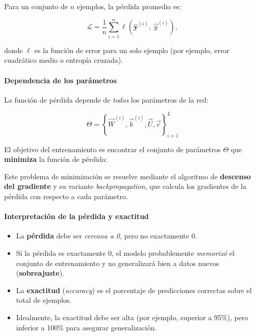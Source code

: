 Para un conjunto de $n$ ejemplos, la pérdida promedio es:

\begin{equation}
\label{eq:loss}
\mathcal{L} = \frac{1}{n} \sum_{i=1}^{n} \ell\!\left( \hat{\mathbf{y}}^{(i)},\, \vec{y}^{(i)} \right),
\end{equation}

donde $\ell$ es la función de error para un solo ejemplo (por ejemplo, error cuadrático medio o entropía cruzada).

\paragraph{Dependencia de los parámetros}

La función de pérdida depende de \emph{todos} los parámetros de la red:

\begin{equation}
\label{eq:theta}
\Theta = \left\{ \vec{W}^{(i)}, \vec{b}^{(i)}, \vec{U}, \vec{c} \right\}_{i=1}^{L}
\end{equation}

El objetivo del entrenamiento es encontrar el conjunto de parámetros $\Theta$ que \textbf{minimiza} la función de pérdida:

Este problema de minimización se resuelve mediante el algoritmo de \textbf{descenso del gradiente} y su variante \emph{backpropagation}, que calcula los gradientes de la pérdida con respecto a cada parámetro.

\paragraph{Interpretación de la pérdida y exactitud}

\begin{itemize}[topsep=2pt,itemsep=1pt]
  \item La \textbf{pérdida} debe ser \emph{cercana a 0}, pero no exactamente 0.
  \item Si la pérdida es exactamente 0, el modelo probablemente \emph{memorizó} el conjunto de entrenamiento y no generalizará bien a datos nuevos (\textbf{sobreajuste}).
  \item La \textbf{exactitud} (\emph{accuracy}) es el porcentaje de predicciones correctas sobre el total de ejemplos.
  \item Idealmente, la exactitud debe ser alta (por ejemplo, superior a 95\%), pero inferior a 100\% para asegurar generalización.
\end{itemize}
